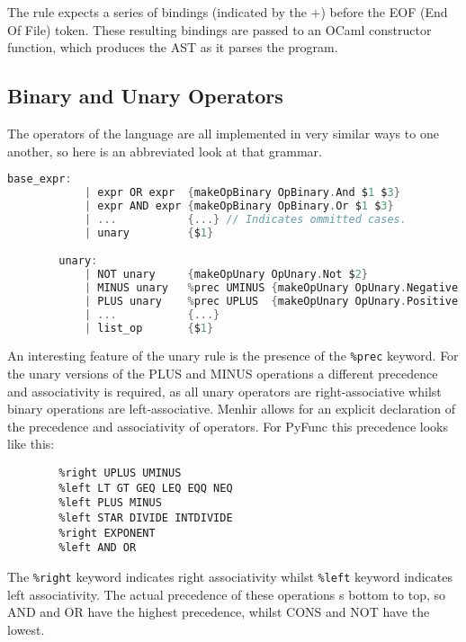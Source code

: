 \documentclass{l4proj}
\begin{document}
    The rule expects a series of bindings (indicated by the $+$) before the EOF (End Of File) token.
    These resulting bindings are passed to an OCaml constructor function, which produces the AST as it parses the program.

\subsection*{Binary and Unary Operators}
    
    The operators of the language are all implemented in very similar ways to one another, so here is an abbreviated look at that grammar.
    \begin{lstlisting}[language=C, keepspaces=true, caption=An abrreviated version of PyFunc Parser's implementation of binary and unary operators.]
        base_expr:
            | expr OR expr  {makeOpBinary OpBinary.And $1 $3}
            | expr AND expr {makeOpBinary OpBinary.Or $1 $3}
            | ...           {...} // Indicates ommitted cases.
            | unary         {$1}

        unary:
            | NOT unary     {makeOpUnary OpUnary.Not $2}
            | MINUS unary   %prec UMINUS {makeOpUnary OpUnary.Negative $2}
            | PLUS unary    %prec UPLUS  {makeOpUnary OpUnary.Positive $2}
            | ...           {...}
            | list_op       {$1}
    \end{lstlisting}

    An interesting feature of the unary rule is the presence of the \texttt{\%prec} keyword.
    For the unary versions of the PLUS and MINUS operations a different precedence and associativity is required, as all unary operators are right-associative whilst binary operations are left-associative.
    Menhir allows for an explicit declaration of the precedence and associativity of operators.
    For PyFunc this precedence looks like this:
    \begin{lstlisting}[caption=PyFunc's Menhir precedence and associativity declarations.]
        %right CONS NOT
        %right UPLUS UMINUS
        %left LT GT GEQ LEQ EQQ NEQ
        %left PLUS MINUS
        %left STAR DIVIDE INTDIVIDE
        %right EXPONENT
        %left AND OR
    \end{lstlisting}
    The \texttt{\%right} keyword indicates right associativity whilst \texttt{\%left} keyword indicates left associativity.
    The actual precedence of these operations s bottom to top, so AND and OR have the highest precedence, whilst CONS and NOT have the lowest.
\end{document}
